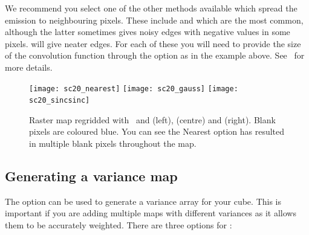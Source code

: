 \documentclass[11pt,oneside,chapters]{starlink}
\begin{document}

We recommend you select one of the other methods available which
spread the emission to neighbouring pixels.  These include
 and  which are the most common, although
the latter sometimes gives noisy edges with negative values in some
pixels.  will give neater edges. For each of these you
will need to provide the size of the convolution function through the
 option as in the example above. See \smurfsun\ for more
details.


\begin{figure}[h!]
\begin{center}
\texttt{[image: sc20\_nearest]}
\texttt{[image: sc20\_gauss]}
\texttt{[image: sc20\_sincsinc]}
\caption[Options for the \makecube\ parameter `spread']{\label{fig:spread}
  Raster map regridded with \makecube\ and 
  (left),  (centre) and  (right). Blank
  pixels are coloured blue. You can see the Nearest option has
  resulted in multiple blank pixels throughout the map.}
\end{center}
\end{figure}


\subsection{Generating a variance map}

The option  can be used to generate a variance array for
your cube. This is important if you are adding multiple maps with
different variances as it allows them to be accurately weighted. There
are three options for :
\end{document}
